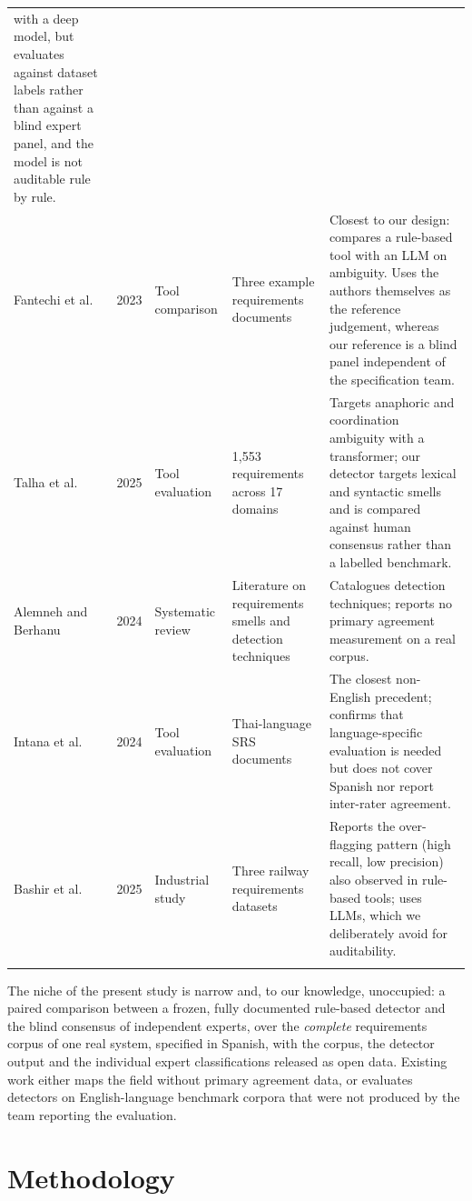 \documentclass[pdflatex,sn-mathphys-num]{sn-jnl}
\theoremstyle{thmstyleone}%
\theoremstyle{thmstyletwo}%
\theoremstyle{thmstylethree}%
\begin{document}
\begin{table}[h]
\begin{tabular}{@{}p{2.1cm}p{0.7cm}p{2.2cm}p{2.4cm}p{4.0cm}@{}}
with a deep model, but evaluates against dataset labels rather than against a
blind expert panel, and the model is not auditable rule by rule. \\
Fantechi et al.~\cite{fantechi2023} & 2023 & Tool comparison & Three example
requirements documents & Closest to our design: compares a rule-based tool with
an LLM on ambiguity. Uses the authors themselves as the reference judgement,
whereas our reference is a blind panel independent of the specification team. \\
Talha et al.~\cite{talha2025} & 2025 & Tool evaluation & 1,553 requirements
across 17 domains & Targets anaphoric and coordination ambiguity with a
transformer; our detector targets lexical and syntactic smells and is compared
against human consensus rather than a labelled benchmark. \\
Alemneh and Berhanu~\cite{alemneh2024} & 2024 & Systematic review & Literature
on requirements smells and detection techniques & Catalogues detection
techniques; reports no primary agreement measurement on a real corpus. \\
Intana et al.~\cite{intana2024} & 2024 & Tool evaluation & Thai-language SRS
documents & The closest non-English precedent; confirms that language-specific
evaluation is needed but does not cover Spanish nor report inter-rater
agreement. \\
Bashir et al.~\cite{bashir2025} & 2025 & Industrial study & Three railway
requirements datasets & Reports the over-flagging pattern (high recall, low
precision) also observed in rule-based tools; uses LLMs, which we deliberately
avoid for auditability. \\
\botrule
\end{tabular}
\end{table}

The niche of the present study is narrow and, to our knowledge, unoccupied: a
paired comparison between a frozen, fully documented rule-based detector and the
blind consensus of independent experts, over the \emph{complete} requirements
corpus of one real system, specified in Spanish, with the corpus, the detector
output and the individual expert classifications released as open data. Existing
work either maps the field without primary agreement data, or evaluates
detectors on English-language benchmark corpora that were not produced by the
team reporting the evaluation.

\section{Methodology}\label{sec:method}
\end{document}
